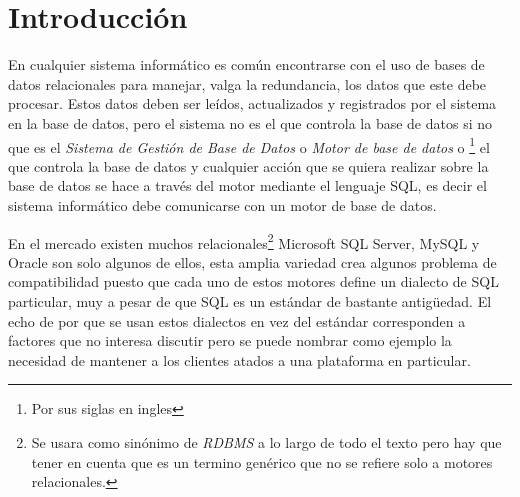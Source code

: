 \chapter{Introducción}\label{capitulo:intro}
En cualquier sistema informático es común encontrarse con el uso de bases de datos relacionales para manejar, valga la redundancia, los datos que este debe procesar. Estos datos deben ser leídos, actualizados y registrados por el sistema en la base de datos, pero el sistema no es el que controla la base de datos si no que es el \textit{Sistema de Gestión de Base de Datos} o \textit{Motor de base de datos} o \textit{\dd}\footnote{Por sus siglas en ingles} el que controla la base de datos y cualquier acción que se quiera realizar sobre la base de datos se hace a través del motor mediante el lenguaje SQL, es decir el sistema informático debe comunicarse con un motor de base de datos.

En el mercado existen muchos \dd relacionales\footnote{Se usara \dd como sinónimo de \textit{RDBMS} a lo largo de todo el texto pero hay que tener en cuenta que \dd es un termino genérico que no se refiere solo a motores relacionales.} Microsoft SQL Server, MySQL y Oracle son solo algunos de ellos, esta amplia variedad crea algunos problema de compatibilidad puesto que cada uno de estos motores define un dialecto de SQL particular, muy a pesar de que SQL es un estándar de bastante antigüedad. El echo de por que se usan estos dialectos en vez del estándar corresponden a factores que no interesa discutir pero se puede nombrar como ejemplo la necesidad de mantener a los clientes atados a una plataforma en particular.

